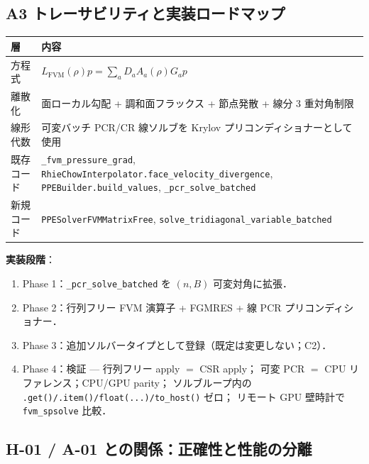 \subsection{A3 トレーサビリティと実装ロードマップ}
\label{sec:gpu_fvm_a3_roadmap}

\begin{center}
\footnotesize
\begin{tabular}{@{}p{}>{\raggedright\arraybackslash}p{}@{}}
\hline
層 & 内容 \\
\hline
方程式 & $L_\text{FVM}(\rho)p = \sum_a D_a A_a(\rho)G_a p$ \\
離散化 & 面ローカル勾配 + 調和面フラックス + 節点発散 + 線分 3 重対角制限 \\
線形代数 & 可変バッチ PCR/CR 線ソルブを Krylov プリコンディショナーとして使用 \\
既存コード & \texttt{\_fvm\_pressure\_grad},
  \texttt{RhieChowInterpolator.face\_velocity\_divergence},
  \texttt{PPEBuilder.build\_values},
  \texttt{\_pcr\_solve\_batched} \\
新規コード & \texttt{PPESolverFVMMatrixFree},
  \texttt{solve\_tridiagonal\_variable\_batched} \\
\hline
\end{tabular}
\end{center}

\noindent\textbf{実装段階}：
\begin{enumerate}[noitemsep]
  \item Phase 1：\texttt{\_pcr\_solve\_batched} を $(n,B)$ 可変対角に拡張．
  \item Phase 2：行列フリー FVM 演算子 + FGMRES + 線 PCR プリコンディショナー．
  \item Phase 3：追加ソルバータイプとして登録（既定は変更しない；C2）．
  \item Phase 4：検証 — 行列フリー apply $=$ CSR apply；
        可変 PCR $=$ CPU リファレンス；CPU/GPU parity；
        ソルブループ内の \texttt{.get()/.item()/float(...)/to\_host()} ゼロ；
        リモート GPU 壁時計で \texttt{fvm\_spsolve} 比較．
\end{enumerate}

\subsection{H-01 / A-01 との関係：正確性と性能の分離}
\label{sec:gpu_fvm_h01_a01}

